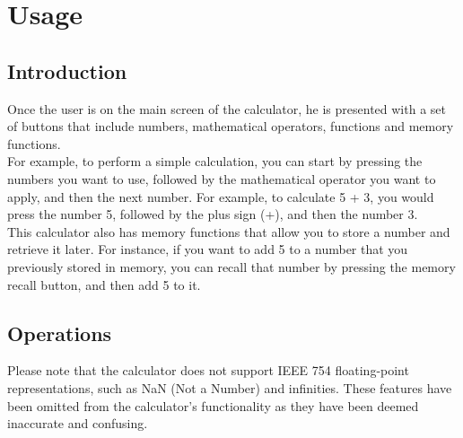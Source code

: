 \section{Usage}
\subsection{Introduction}
Once the user is on the main screen of the calculator, he is presented with a set of buttons that include numbers, mathematical operators, functions and memory functions. \\

For example, to perform a simple calculation, you can start by pressing the numbers you want to use, followed by the mathematical operator you want to apply, and then the next number. For example, to calculate 5 + 3, you would press the number 5, followed by the plus sign (+), and then the number 3.\\

This calculator also has memory functions that allow you to store a number and retrieve it later. For instance, if you want to add 5 to a number that you previously stored in memory, you can recall that number by pressing the memory recall button, and then add 5 to it.

\subsection{Operations}

Please note that the calculator does not support IEEE 754 floating-point representations, such as NaN (Not a Number) and infinities. These features have been omitted from the calculator's functionality as they have been deemed inaccurate and confusing.


